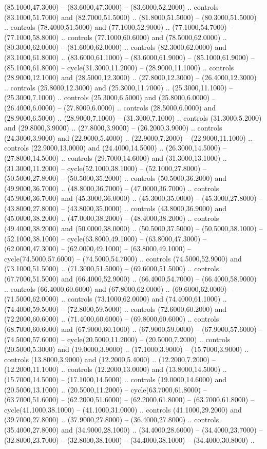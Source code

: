 (85.1000,47.3000) -- (83.6000,47.3000) -- (83.6000,52.2000) .. controls (83.1000,51.7000) and (82.7000,51.5000) .. (81.8000,51.5000) -- (80.3000,51.5000) .. controls (78.4000,51.5000) and (77.1000,52.9000) .. (77.1000,54.7000) -- (77.1000,58.8000) .. controls (77.1000,60.6000) and (78.5000,62.0000) .. (80.3000,62.0000) -- (81.6000,62.0000) .. controls (82.3000,62.0000) and (83.1000,61.8000) .. (83.6000,61.1000) -- (83.6000,61.9000) -- (85.1000,61.9000) -- (85.1000,61.8000) -- cycle(31.3000,11.2000) -- (28.9000,11.1000) .. controls (28.9000,12.1000) and (28.5000,12.3000) .. (27.8000,12.3000) -- (26.4000,12.3000) .. controls (25.8000,12.3000) and (25.3000,11.7000) .. (25.3000,11.1000) -- (25.3000,7.1000) .. controls (25.3000,6.5000) and (25.8000,6.0000) .. (26.4000,6.0000) -- (27.8000,6.0000) .. controls (28.5000,6.0000) and (28.9000,6.5000) .. (28.9000,7.1000) -- (31.3000,7.1000) .. controls (31.3000,5.2000) and (29.8000,3.9000) .. (27.8000,3.9000) -- (26.2000,3.9000) .. controls (24.3000,3.9000) and (22.9000,5.4000) .. (22.9000,7.2000) -- (22.9000,11.1000) .. controls (22.9000,13.0000) and (24.4000,14.5000) .. (26.3000,14.5000) -- (27.8000,14.5000) .. controls (29.7000,14.6000) and (31.3000,13.1000) .. (31.3000,11.2000) -- cycle(52.1000,38.1000) -- (52.1000,27.8000) -- (50.5000,27.8000) -- (50.5000,35.2000) .. controls (50.5000,36.2000) and (49.9000,36.7000) .. (48.8000,36.7000) -- (47.0000,36.7000) .. controls (45.9000,36.7000) and (45.3000,36.0000) .. (45.3000,35.0000) -- (45.3000,27.8000) -- (43.8000,27.8000) -- (43.8000,35.0000) .. controls (43.8000,36.9000) and (45.0000,38.2000) .. (47.0000,38.2000) -- (48.4000,38.2000) .. controls (49.4000,38.2000) and (50.0000,38.0000) .. (50.5000,37.5000) -- (50.5000,38.1000) -- (52.1000,38.1000) -- cycle(63.8000,49.1000) -- (63.8000,47.3000) -- (62.0000,47.3000) -- (62.0000,49.1000) -- (63.8000,49.1000) -- cycle(74.5000,57.6000) -- (74.5000,54.7000) .. controls (74.5000,52.9000) and (73.1000,51.5000) .. (71.3000,51.5000) -- (69.6000,51.5000) .. controls (67.7000,51.5000) and (66.4000,52.9000) .. (66.4000,54.7000) -- (66.4000,58.9000) .. controls (66.4000,60.6000) and (67.8000,62.0000) .. (69.6000,62.0000) -- (71.5000,62.0000) .. controls (73.1000,62.0000) and (74.4000,61.1000) .. (74.4000,59.5000) -- (72.8000,59.5000) .. controls (72.6000,60.2000) and (72.2000,60.6000) .. (71.4000,60.6000) -- (69.8000,60.6000) .. controls (68.7000,60.6000) and (67.9000,60.1000) .. (67.9000,59.0000) -- (67.9000,57.6000) -- (74.5000,57.6000) -- cycle(20.5000,11.2000) -- (20.5000,7.2000) .. controls (20.5000,5.3000) and (19.0000,3.9000) .. (17.1000,3.9000) -- (15.7000,3.9000) .. controls (13.8000,3.9000) and (12.2000,5.4000) .. (12.2000,7.2000) -- (12.2000,11.1000) .. controls (12.2000,13.0000) and (13.8000,14.5000) .. (15.7000,14.5000) -- (17.1000,14.5000) .. controls (19.0000,14.6000) and (20.5000,13.1000) .. (20.5000,11.2000) -- cycle(63.7000,61.8000) -- (63.7000,51.6000) -- (62.2000,51.6000) -- (62.2000,61.8000) -- (63.7000,61.8000) -- cycle(41.1000,38.1000) -- (41.1000,31.0000) .. controls (41.1000,29.2000) and (39.7000,27.8000) .. (37.9000,27.8000) -- (36.4000,27.8000) .. controls (35.4000,27.8000) and (34.9000,28.1000) .. (34.4000,28.6000) -- (34.4000,23.7000) -- (32.8000,23.7000) -- (32.8000,38.1000) -- (34.4000,38.1000) -- (34.4000,30.8000) .. 